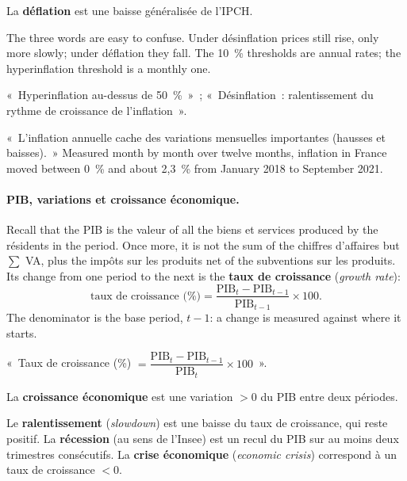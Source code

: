 \begin{definition}[Déflation]
  La \textbf{déflation} est une baisse généralisée de l'IPCH.
\end{definition}

The three words are easy to confuse. Under désinflation prices still rise, only
more slowly; under déflation they fall. The 10~\% thresholds are annual rates;
the hyperinflation threshold is a monthly one.

\begin{remark}
  «~Hyperinflation au-dessus de 50~\%~»~; «~Désinflation~: ralentissement du
  rythme de croissance de l'inflation~».
\end{remark}

«~L'inflation annuelle cache des variations mensuelles importantes (hausses et
baisses).~» Measured month by month over twelve months, inflation in France
moved between 0~\% and about 2,3~\% from January 2018 to September 2021.

\paragraph{PIB, variations et croissance économique.} Recall that the PIB is
the valeur of all the biens et services produced by the résidents in the
period. Once more, it is not the sum of the chiffres
d'affaires but $\sum$ VA, plus the impôts sur les produits net of the
subventions sur les produits. Its change from one period to the next is the
\textbf{taux de croissance} (\textit{growth rate}):
\[
  \text{taux de croissance (\%)}
  = \frac{\text{PIB}_t - \text{PIB}_{t-1}}{\text{PIB}_{t-1}} \times 100 .
\]
The denominator is the base period, $t-1$: a change is measured against where it
starts.

\begin{remark}
  «~Taux de croissance (\%) $= \dfrac{\text{PIB}_t - \text{PIB}_{t-1}}
  {\text{PIB}_t} \times 100$~».
\end{remark}

\begin{definition}
  La \textbf{croissance économique} est une variation $> 0$ du PIB entre deux
  périodes.
\end{definition}

\begin{definition}
  Le \textbf{ralentissement} (\textit{slowdown}) est une baisse du taux de
  croissance, qui reste positif. La \textbf{récession} (au sens de l'Insee) est un recul du PIB sur au
  moins deux trimestres consécutifs. La \textbf{crise économique}
  (\textit{economic crisis}) correspond à un taux de croissance $< 0$.
\end{definition}

